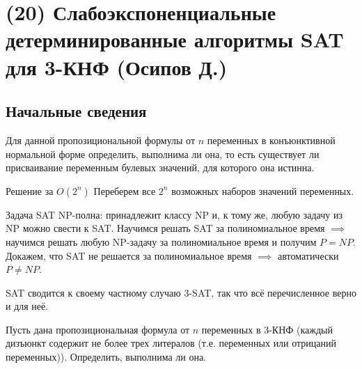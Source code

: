 \hypertarget{3sat}{}
\section{(20) Слабоэкспоненциальные детерминированные алгоритмы SAT для 3-КНФ (Осипов Д.)}
\subsection{Начальные сведения}
\begin{problem*}[SAT]
Для данной пропозициональной формулы от $n$ переменных в конъюнктивной нормальной форме определить, выполнима ли она,
то есть существует ли присваивание переменным булевых значений, для которого она истинна.
\end{problem*}

\begin{algodescription}{Решение за $O(2^n)$}
    Переберем все $2^n$ возможных наборов значений переменных.
\end{algodescription}

\begin{nb*}
    Задача SAT NP-полна: принадлежит классу NP и, к тому же, любую задачу из NP можно свести к SAT. Научимся решать SAT за полиномиальное время $\implies$ научимся решать любую NP-задачу за полиномиальное время и получим $P=NP$. Докажем, что SAT не решается за полиномиальное время $\implies$ автоматически $P\neq NP$.
\end{nb*}

\begin{nb*} 
    SAT сводится к своему частному случаю 3-SAT, так что всё перечисленное верно и для неё.
\end{nb*}

\begin{problem*}[3-SAT]
	Пусть дана пропозициональная формула от $n$ переменных в 3-КНФ (каждый дизъюнкт содержит не более трех литералов (т.е. переменных или отрицаний переменных)). Определить, выполнима ли она.
\end{problem*}

